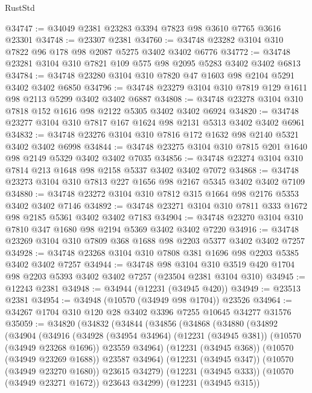 \begin{lexlean}{RustStd}
\begin{coremodule}
@34747 := @34049 @2381 @23283 @3394 @7823 @98 @3610 @7765 @3616 @23301
@34748 := @23307 @2381
@34760 := @34748 @23282 @3104 @310 @7822 @96 @178 @98 @2087 @5275 @3402 @3402 @6776
@34772 := @34748 @23281 @3104 @310 @7821 @109 @575 @98 @2095 @5283 @3402 @3402 @6813
@34784 := @34748 @23280 @3104 @310 @7820 @47 @1603 @98 @2104 @5291 @3402 @3402 @6850
@34796 := @34748 @23279 @3104 @310 @7819 @129 @1611 @98 @2113 @5299 @3402 @3402 @6887
@34808 := @34748 @23278 @3104 @310 @7818 @152 @1616 @98 @2122 @5305 @3402 @3402 @6924
@34820 := @34748 @23277 @3104 @310 @7817 @167 @1624 @98 @2131 @5313 @3402 @3402 @6961
@34832 := @34748 @23276 @3104 @310 @7816 @172 @1632 @98 @2140 @5321 @3402 @3402 @6998
@34844 := @34748 @23275 @3104 @310 @7815 @201 @1640 @98 @2149 @5329 @3402 @3402 @7035
@34856 := @34748 @23274 @3104 @310 @7814 @213 @1648 @98 @2158 @5337 @3402 @3402 @7072
@34868 := @34748 @23273 @3104 @310 @7813 @227 @1656 @98 @2167 @5345 @3402 @3402 @7109
@34880 := @34748 @23272 @3104 @310 @7812 @315 @1664 @98 @2176 @5353 @3402 @3402 @7146
@34892 := @34748 @23271 @3104 @310 @7811 @333 @1672 @98 @2185 @5361 @3402 @3402 @7183
@34904 := @34748 @23270 @3104 @310 @7810 @347 @1680 @98 @2194 @5369 @3402 @3402 @7220
@34916 := @34748 @23269 @3104 @310 @7809 @368 @1688 @98 @2203 @5377 @3402 @3402 @7257
@34928 := @34748 @23268 @3104 @310 @7808 @381 @1696 @98 @2203 @5385 @3402 @3402 @7257
@34944 := @34748
    @98
    @3104
    @310
    @3519
    @420
    @1704
    @98
    @2203
    @5393
    @3402
    @3402
    @7257
    (@23504 @2381 @3104 @310)
@34945 := @12243 @2381
@34948 := @34944 (@12231 (@34945 @420))
@34949 := @23513 @2381
@34954 := @34948 (@10570 (@34949 @98 @1704)) @23526
@34964 := @34267 @1704 @310 @120 @28 @3402 @3396 @7255 @10645 @34277 @31576
@35059 := @34820
    (@34832
      (@34844
        (@34856
          (@34868
            (@34880
              (@34892
                (@34904
                  (@34916
                    (@34928
                      (@34954 @34964)
                      (@12231 (@34945 @381))
                      (@10570 (@34949 @23268 @1696))
                      @23559
                      @34964)
                    (@12231 (@34945 @368))
                    (@10570 (@34949 @23269 @1688))
                    @23587
                    @34964)
                  (@12231 (@34945 @347))
                  (@10570 (@34949 @23270 @1680))
                  @23615
                  @34279)
                (@12231 (@34945 @333))
                (@10570 (@34949 @23271 @1672))
                @23643
                @34299)
              (@12231 (@34945 @315))

\end{coremodule}
\end{lexlean}
